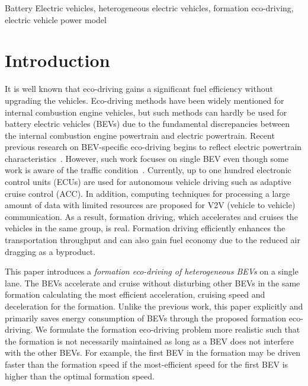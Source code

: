 \documentclass{IEEEtran}
\begin{document}
\begin{IEEEkeywords}
Battery Electric vehicles, heterogeneous electric vehicles, formation eco-driving, electric vehicle power model
\end{IEEEkeywords}



\section{Introduction}

It is well known that eco-driving gains a significant fuel efficiency without upgrading the vehicles.
Eco-driving methods have been widely mentioned for internal combustion engine vehicles, but such methods can hardly be used for battery electric vehicles (BEVs) due to the fundamental discrepancies between the internal combustion engine powertrain and electric powertrain.
Recent previous research on BEV-specific eco-driving begins to reflect electric powertrain characteristics~\cite{Lin:ICCA14, Wu:ITS15, Dib:IVPPC11}. However, such work focuses on single BEV even though some work is aware of the traffic condition~\cite{Dib:CEP14, Wu:ITS15}. 
Currently, up to one hundred electronic control units (ECUs) are used for autonomous vehicle driving such as adaptive cruise control (ACC). In addition, computing techniques for processing a large amount of data with limited resources are proposed for V2V (vehicle to vehicle) communication. As a result, formation driving, which accelerates and cruises the vehicles in the same group, is real. Formation driving efficiently enhances the transportation throughput and can also gain fuel economy due to the reduced air dragging as a byproduct.

This paper introduces a \textit{formation eco-driving of heterogeneous BEVs} on a single lane. The BEVs accelerate and cruise without disturbing other BEVs in the same formation calculating the most efficient acceleration, cruising speed and deceleration for the formation. Unlike the previous work, this paper explicitly and primarily saves energy consumption of BEVs through the proposed formation eco-driving. 
We formulate the formation eco-driving problem more realistic such that the formation is not necessarily maintained as long as a BEV does not interfere with the other BEVs. For example, the first BEV in the formation may be driven faster than the formation speed if the most-efficient speed for the first BEV is higher than the optimal formation speed. 
\end{document}
